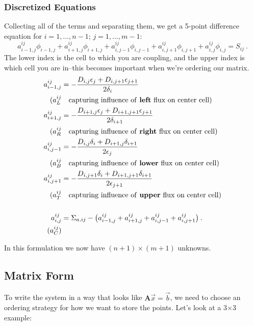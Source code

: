 \documentclass[12pt]{exam}
\newcommand{\ve}[1]{\ensuremath{\mathbf{#1}}}
\begin{document}
\subsubsection*{Discretized Equations}
\ifprintanswers
Collecting all of the terms and separating them, we get a 5-point difference equation for $i=1,\dots,n-1$; $j=1,\dots,m-1$:
%
\[a_{i-1,j}^{ij}\phi_{i-1,j} + a_{i+1,j}^{ij}\phi_{i+1,j} + a_{i,j-1}^{ij}\phi_{i,j-1} + a_{i,j+1}^{ij}\phi_{i,j+1} +  a_{i,j}^{ij}\phi_{i,j} = S_{ij} \:.\]
%
\else
\vspace*{3em} 
\fi
The lower index is the cell to which you are coupling, and the upper index is which cell you are in--this becomes important when we're ordering our matrix.
%
\begin{align}
a_{i-1,j}^{ij} &= -\frac{D_{i,j} \epsilon_{j} + D_{i,j+1} \epsilon_{j+1}}{2 \delta_{i}}  \nonumber \\
(a_L^{ij} & \quad \text{capturing influence of \textbf{left} flux on center cell}) \nonumber \\
%
a_{i+1,j}^{ij} &= -\frac{D_{i+1,j} \epsilon_{j} + D_{i+1,j+1} \epsilon_{j+1}}{2 \delta_{i+1}}  \nonumber \\
(a_R^{ij} & \quad \text{capturing influence of \textbf{right} flux on center cell}) \nonumber \\
%
a_{i,j-1}^{ij} &= -\frac{D_{i,j} \delta_{i} + D_{i+1,j} \delta_{i+1}}{2 \epsilon_{j}}  \nonumber \\
(a_B^{ij} & \quad \text{capturing influence of \textbf{lower} flux on center cell}) \nonumber \\
%
a_{i,j+1}^{ij} &= -\frac{D_{i,j+1} \delta_{i} + D_{i+1,j+1} \delta_{i+1}}{2 \epsilon_{j+1}}  \nonumber \\
(a_T^{ij} & \quad \text{capturing influence of \textbf{upper} flux on center cell}) \nonumber \\
%
\nonumber \\
a_{i,j}^{ij} &= \Sigma_{a,ij} - \bigl(a_{i-1,j}^{ij} + a_{i+1,j}^{ij} + a_{i,j-1}^{ij} + a_{i,j+1}^{ij} \bigr)
 \:.\nonumber \\
 (a_C^{ij}) & \nonumber
\end{align}

In this formulation we now have $(n+1) \times (m+1)$ unknowns. 

\subsection*{Matrix Form}
To write the system in a way that looks like $\ve{A}\vec{x} = \vec{b}$, we need to choose an ordering strategy for how we want to store the points. Let's look at a 3$\times$3 example:
\end{document}
